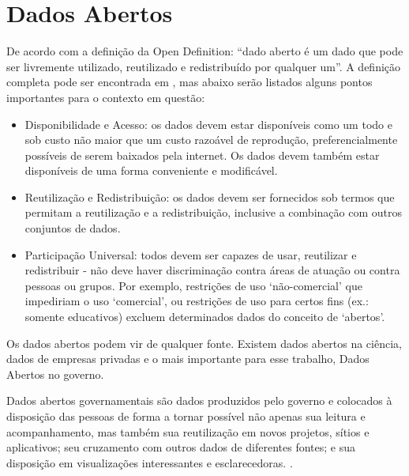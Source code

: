 \chapter{Dados Abertos}

De acordo com a definição da Open Definition: “dado aberto é um dado que pode ser livremente utilizado, reutilizado e redistribuído por qualquer um”. A definição completa pode ser encontrada em \cite{open}, mas abaixo serão listados alguns pontos importantes para o contexto em questão:
\begin{itemize}
\item Disponibilidade e Acesso: os dados devem estar disponíveis como um todo e sob custo não maior que um custo razoável de reprodução, preferencialmente possíveis de serem baixados pela internet. Os dados devem também estar disponíveis de uma forma conveniente e modificável.
\item Reutilização e Redistribuição: os dados devem ser fornecidos sob termos que permitam a reutilização e a redistribuição, inclusive a combinação com outros conjuntos de dados.
\item Participação Universal: todos devem ser capazes de usar, reutilizar e redistribuir - não deve haver discriminação contra áreas de atuação ou contra pessoas ou grupos. Por exemplo, restrições de uso ‘não-comercial’ que impediriam o uso ‘comercial’, ou restrições de uso para certos fins (ex.: somente educativos) excluem determinados dados do conceito de ‘abertos’.
\end{itemize}

Os dados abertos podem vir de qualquer fonte. Existem dados abertos na ciência, dados de empresas privadas e o mais importante para esse trabalho, Dados Abertos no governo.

Dados abertos governamentais são dados produzidos pelo governo e colocados à disposição das pessoas de forma a tornar possível não apenas sua leitura e acompanhamento, mas também sua reutilização em novos projetos, sítios e aplicativos; seu cruzamento com outros dados de diferentes fontes; e sua disposição em visualizações interessantes e esclarecedoras. \cite{manual}.

